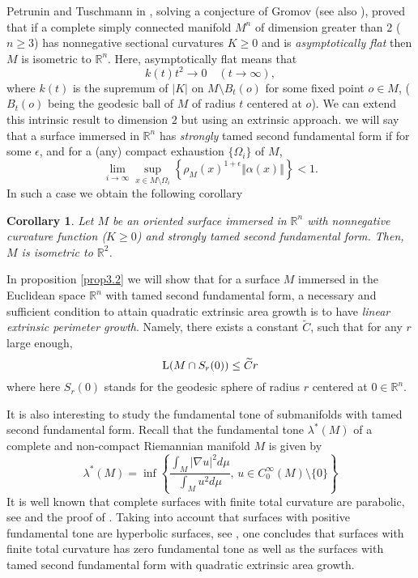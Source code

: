 \documentclass[a4paper]{amsart}
\newtheorem{corollary}[theorem]{Corollary}
\theoremstyle{definition}
\numberwithin{equation}{section}
\begin{document}
Petrunin and Tuschmann in \cite{Petrunin2001} , solving a conjecture of Gromov \cite{Ballmann85} (see also \cite{Drees94}), proved that if a complete simply connected manifold $M^n$ of dimension greater than $2$ ($n\geq 3$) has nonnegative sectional curvatures $K\geq 0$  and is \emph{asymptotically flat} then $M$ is isometric to ${\mathbb{R}}^n$. Here, asymptotically flat means that
\begin{equation}
k(t)t^{2}\to 0\quad (t\to\infty),
\end{equation}
where $k(t)$ is the supremum of $\vert K\vert$ on $M\setminus B_t(o)$ for some fixed point $o\in M$, ($B_t(o)$ being the geodesic ball of $M$ of radius $t$ centered at $o$). We can extend this intrinsic result to dimension $2$ but using an extrinsic approach. we will say that a surface immersed in ${\mathbb{R}}^n$ has \emph{strongly} tamed second fundamental form if for some $\epsilon$, and for a (any) compact exhaustion $\{\Omega_i\}$ of $M$,
\begin{equation}
\lim_{i\to\infty}\sup_{x\in M\setminus \Omega_i}\left\{\rho_M(x)^{1+\epsilon}\Vert\alpha(x)\Vert\right\}<1.
\end{equation}
In such a case we obtain the following corollary
\begin{corollary}\label{cor1.4}
Let $M$ be an oriented surface immersed in ${\mathbb{R}}^n$ with nonnegative curvature function ($K\geq 0$) and  strongly tamed second fundamental form. Then,  $M$ is isometric to ${\mathbb{R}}^2$.
\end{corollary}

In proposition \ref{prop3.2} we will show that for a surface $M$ immersed in the Euclidean space ${\mathbb{R}}^n$ with tamed second fundamental form, a necessary and sufficient condition to attain  quadratic extrinsic area growth is to have \emph{linear extrinsic perimeter growth}. Namely, there exists a constant $\widetilde C$, such that for any $r$ large enough,
$$
{\rm L}(M\cap S_r(0))\leq \widetilde C r
$$
where here $S_r(0)$ stands for the geodesic sphere of radius $r$ centered at $0\in {\mathbb{R}}^n$.

It is also interesting to study the fundamental tone of submanifolds with tamed second fundamental form. Recall that the fundamental tone $\lambda^{\ast}(M)$ of a complete and non-compact Riemannian manifold $M$ is given by\[\lambda^{\ast}(M)=\inf\left\{\frac{\int_{M}\vert \nabla u \vert^{2}d\mu}{\int_{M}u^2d\mu},\,  u \in C^{\infty}_{0}(M)\setminus \{0\} \right\}\]It is well known that complete surfaces with finite total curvature are parabolic, see \cite{I1} and the proof of \cite[theorem 12.2]{Markv2003}. Taking into account that surfaces with positive fundamental tone  are hyperbolic surfaces, see \cite{GriExp}, one  concludes that surfaces with finite total curvature has zero fundamental tone as well as the surfaces with tamed second fundamental form with  quadratic extrinsic area growth.  
\end{document}
